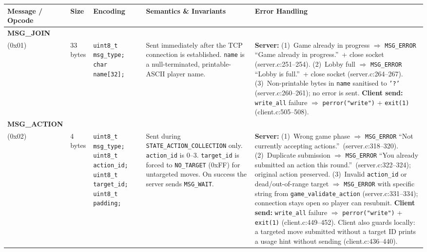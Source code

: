\documentclass[11pt,letterpaper]{article}
\begin{document}
\begingroup
\small
\begin{longtable}{@{}p{1.8cm} p{1.2cm} p{2.4cm} p{4.2cm} p{4.8cm}@{}}
\toprule
\textbf{Message / Opcode} & \textbf{Size} & \textbf{Encoding} & \textbf{Semantics \& Invariants} & \textbf{Error Handling} \\
\midrule\endhead

\textbf{MSG\_JOIN}\\(0x01) &
33 bytes &
\texttt{uint8\_t msg\_type;}\newline
\texttt{char name[32];} &
Sent immediately after the TCP connection is established. \texttt{name} is a null-terminated, printable-ASCII player name. &
\textbf{Server:} (1)~Game already in progress $\Rightarrow$ \texttt{MSG\_ERROR} ``Game already in progress.''\ + close socket (server.c:251--254). (2)~Lobby full $\Rightarrow$ \texttt{MSG\_ERROR} ``Lobby is full.''\ + close socket (server.c:264--267). (3)~Non-printable bytes in \texttt{name} sanitised to \texttt{'?'} (server.c:260--261); no error is sent. \textbf{Client send:} \texttt{write\_all} failure $\Rightarrow$ \texttt{perror("write")} + \texttt{exit(1)} (client.c:505--508). \\[4pt]

\textbf{MSG\_ACTION}\\(0x02) &
4 bytes &
\texttt{uint8\_t msg\_type;}\newline
\texttt{uint8\_t action\_id;}\newline
\texttt{uint8\_t target\_id;}\newline
\texttt{uint8\_t padding;} &
Sent during \texttt{STATE\_ACTION\_COLLECTION} only. \texttt{action\_id} is 0--3. \texttt{target\_id} is forced to \texttt{NO\_TARGET} (0xFF) for untargeted moves. On success the server sends \texttt{MSG\_WAIT}. &
\textbf{Server:} (1)~Wrong game phase $\Rightarrow$ \texttt{MSG\_ERROR} ``Not currently accepting actions.''\ (server.c:318--320). (2)~Duplicate submission $\Rightarrow$ \texttt{MSG\_ERROR} ``You already submitted an action this round.''\ (server.c:322--324); original action preserved. (3)~Invalid \texttt{action\_id} or dead/out-of-range target $\Rightarrow$ \texttt{MSG\_ERROR} with specific string from \texttt{game\_validate\_action} (server.c:331--334); connection stays open so player can resubmit. \textbf{Client send:} \texttt{write\_all} failure $\Rightarrow$ \texttt{perror("write")} + \texttt{exit(1)} (client.c:449--452). Client also guards locally: a targeted move submitted without a target ID prints a usage hint without sending (client.c:436--440). \\[4pt]


\end{longtable}
\end{document}
